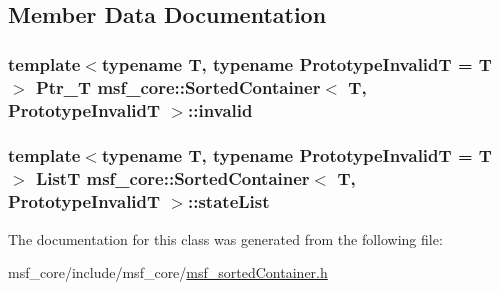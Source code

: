 \subsection{Member Data Documentation}
\hypertarget{classmsf__core_1_1SortedContainer_a60a2f66705f0a77095e763f7dbe2e265}{
\subsubsection[{invalid}]{\setlength{\rightskip}{0pt plus 5cm}template$<$typename T, typename Prototype\-Invalid\-T = T$>$ {\bf Ptr\-\_\-\-T} {\bf msf\-\_\-core\-::\-Sorted\-Container}$<$ T, Prototype\-Invalid\-T $>$\-::invalid\hspace{0.3cm}{\ttfamily [private]}}}\label{classmsf__core_1_1SortedContainer_a60a2f66705f0a77095e763f7dbe2e265}
\hypertarget{classmsf__core_1_1SortedContainer_af9bdeecb0097b80a202d5edd044ffda4}{
\subsubsection[{state\-List}]{\setlength{\rightskip}{0pt plus 5cm}template$<$typename T, typename Prototype\-Invalid\-T = T$>$ {\bf List\-T} {\bf msf\-\_\-core\-::\-Sorted\-Container}$<$ T, Prototype\-Invalid\-T $>$\-::state\-List\hspace{0.3cm}{\ttfamily [private]}}}\label{classmsf__core_1_1SortedContainer_af9bdeecb0097b80a202d5edd044ffda4}


The documentation for this class was generated from the following file\-:\begin{DoxyCompactItemize}
\item 
msf\-\_\-core/include/msf\-\_\-core/\hyperlink{msf__sortedContainer_8h}{msf\-\_\-sorted\-Container.\-h}\end{DoxyCompactItemize}
